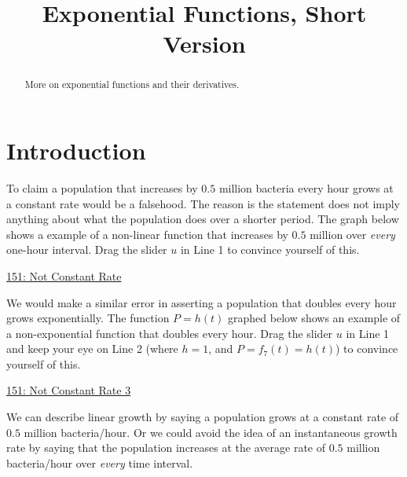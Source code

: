 \documentclass{ximera}
\title{Exponential Functions, Short Version}
\begin{document}
\begin{abstract}
More on exponential functions and their derivatives. 
\end{abstract}
\maketitle



\section{Introduction}

To claim a population that increases by $0.5$ million bacteria every hour grows at a constant rate would be a falsehood. The reason is the statement does not imply anything about what the population does over a shorter period. The graph below shows a example of a non-linear function that increases by $0.5$ million over \emph{every} one-hour interval. Drag the slider $u$ in Line 1 to convince yourself of this.

\href{https://www.desmos.com/calculator/ehtzdzckmy}{151: Not Constant Rate}

 
\begin{onlineOnly}
    \begin{center}
\end{center}
\end{onlineOnly}

We would make a similar error in asserting a population that doubles every hour grows exponentially.  The function $P=h(t)$ graphed below shows an example of a non-exponential function that doubles every hour. Drag the slider $u$ in Line 1 and keep your eye on Line 2 (where $h=1$, and $P=f_7(t) = h(t)$) to convince yourself of this.

\href{https://www.desmos.com/calculator/zapwlt6qju}{151: Not Constant Rate 3} 
 
\begin{onlineOnly}
    \begin{center}
\end{center}
\end{onlineOnly}

We can describe linear growth by saying a population grows at a constant rate of $0.5$ million bacteria/hour. Or we could  avoid the idea of an instantaneous growth rate by saying that the population increases at the average rate of $0.5$ million bacteria/hour over \emph{every} time interval.
\end{document}
